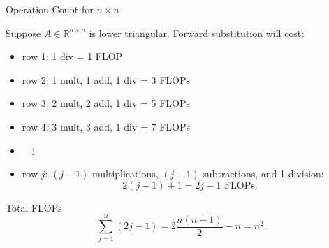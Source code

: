 \documentclass[10pt]{beamer}
\begin{document}
\begin{frame}[shrink]{Operation Count for $n\times n$}

Suppose $A \in \mathbb{R}^{n \times n}$ is lower triangular. Forward substitution will cost:\\[2mm]
  \begin{itemize}
    \item row 1: 1 div = 1 FLOP
    \item row 2: 1 mult, 1 add, 1 div =  3 FLOPs
    \item row 3: 2 mult, 2 add, 1 div = 5 FLOPs
    \item row 4: 3 mult, 3 add, 1 div = 7 FLOPs
    \item  $\quad\vdots$
\item row $j$: $(j-1)$ multiplications,
$(j-1)$ subtractions, and 1 division:
\[
    2(j-1)+1=2j-1 \text{ FLOPs}.
\]
  \end{itemize}

\begin{block}{Total FLOPs}
\[
    \sum_{j=1}^n (2j-1)
    =
    2\frac{n(n+1)}{2}-n
    =
    \boxed{n^2}.
\]
\end{block}


\end{frame}


\end{document}
